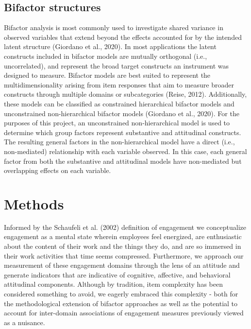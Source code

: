 \documentclass[
  english,
  man]{apa7}
\begin{document}
\hypertarget{bifactor-structures}{%
\subsection{Bifactor structures}\label{bifactor-structures}}

Bifactor analysis is most commonly used to investigate shared variance in observed variables that extend beyond the effects accounted for by the intended latent structure (Giordano et al., 2020). In most applications the latent constructs included in bifactor models are mutually orthogonal (i.e., uncorrelated), and represent the broad target constructs an instrument was designed to measure. Bifactor models are best suited to represent the multidimensionality arising from item responses that aim to measure broader constructs through multiple domains or subcategories (Reise, 2012). Additionally, these models can be classified as constrained hierarchical bifactor models and unconstrained non-hierarchical bifactor models (Giordano et al., 2020). For the purposes of this project, an unconstrained non-hierarchical model is used to determine which group factors represent substantive and attitudinal constructs. The resulting general factors in the non-hierarchical model have a direct (i.e., non-mediated) relationship with each variable observed. In this case, each general factor from both the substantive and attitudinal models have non-mediated but overlapping effects on each variable.

\hypertarget{methods}{%
\section{Methods}\label{methods}}

Informed by the Schaufeli et al. (2002) definition of engagement we conceptualize engagement as a mental state wherein employees feel energized, are enthusiastic about the content of their work and the things they do, and are so immersed in their work activities that time seems compressed. Furthermore, we approach our measurement of these engagement domains through the lens of an attitude and generate indicators that are indicative of cognitive, affective, and behavioral attitudinal components. Although by tradition, item complexity has been considered something to avoid, we eagerly embraced this complexity - both for the methodological extension of bifactor approaches as well as the potential to account for inter-domain associations of engagement measures previously viewed as a nuisance.
\end{document}
